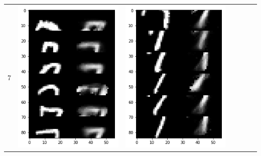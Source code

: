 \documentclass[12pt]{report} %
\begin{document}
\begin{tabular}{m{0.7cm}m{2.4cm}m{2.4cm}m{2.4cm}m{2.4cm}m{2.4cm}m{2.4cm}}
	7 & \includegraphics[scale=0.3]{pictures/KE_7_up.png} & \includegraphics[scale=0.3]{pictures/KE_7_down.png} &

\end{tabular}
\end{document}

